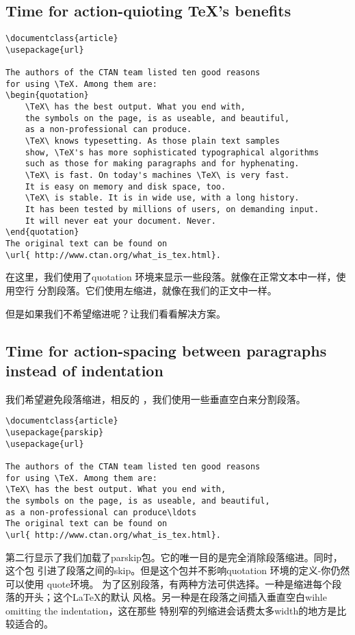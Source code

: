 	\subsection{Time for action-quioting TeX's benefits}
\begin{lstlisting}[language={[LaTeX]TeX}]
\documentclass{article}
\usepackage{url}

The authors of the CTAN team listed ten good reasons
for using \TeX. Among them are:
\begin{quotation}
	\TeX\ has the best output. What you end with,
	the symbols on the page, is as useable, and beautiful,
	as a non-professional can produce.
	\TeX\ knows typesetting. As those plain text samples
	show, \TeX's has more sophisticated typographical algorithms
	such as those for making paragraphs and for hyphenating.
	\TeX\ is fast. On today's machines \TeX\ is very fast.
	It is easy on memory and disk space, too.
	\TeX\ is stable. It is in wide use, with a long history.
	It has been tested by millions of users, on demanding input.
	It will never eat your document. Never.
\end{quotation}
The original text can be found on
\url{ http://www.ctan.org/what_is_tex.html}.

\end{lstlisting}
在这里，我们使用了quotation 环境来显示一些段落。就像在正常文本中一样，使用空行
分割段落。它们使用左缩进，就像在我们的正文中一样。

但是如果我们不希望缩进呢？让我们看看解决方案。
\subsection{Time for action-spacing between paragraphs instead of indentation}
我们希望避免段落缩进，相反的 ，我们使用一些垂直空白来分割段落。
\begin{lstlisting}[language={[LaTeX]TeX}]
\documentclass{article}
\usepackage{parskip}
\usepackage{url}

The authors of the CTAN team listed ten good reasons
for using \TeX. Among them are:
\TeX\ has the best output. What you end with,
the symbols on the page, is as useable, and beautiful,
as a non-professional can produce\ldots
The original text can be found on
\url{ http://www.ctan.org/what_is_tex.html}.

\end{lstlisting}
第二行显示了我们加载了parskip包。它的唯一目的是完全消除段落缩进。同时，这个包
引进了段落之间的skip。但是这个包并不影响quotation 环境的定义-你仍然可以使用
quote环境。
为了区别段落，有两种方法可供选择。一种是缩进每个段落的开头；这个LaTeX的默认
风格。另一种是在段落之间插入垂直空白wihle omitting the indentation，这在那些
特别窄的列缩进会话费太多width的地方是比较适合的。
